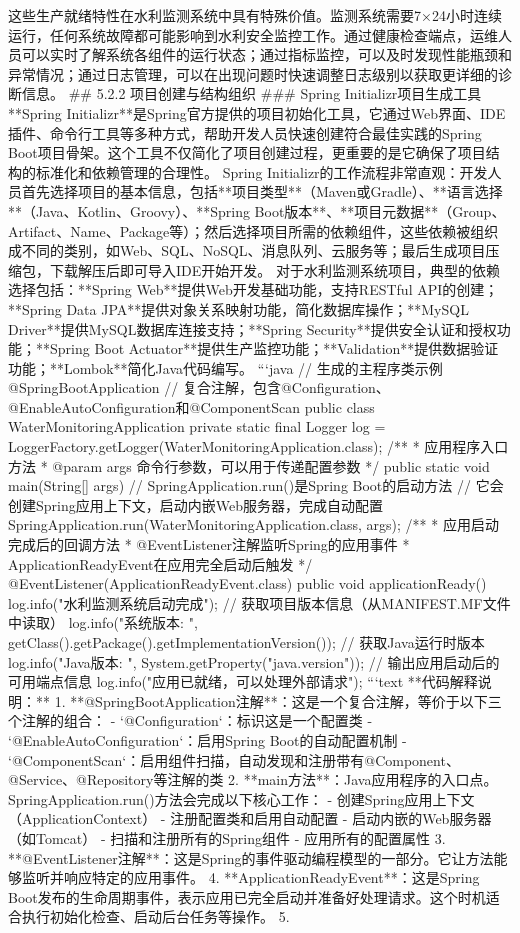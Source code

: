 这些生产就绪特性在水利监测系统中具有特殊价值。监测系统需要7×24小时连续运行，任何系统故障都可能影响到水利安全监控工作。通过健康检查端点，运维人员可以实时了解系统各组件的运行状态；通过指标监控，可以及时发现性能瓶颈和异常情况；通过日志管理，可以在出现问题时快速调整日志级别以获取更详细的诊断信息。 ## 5.2.2 项目创建与结构组织 ### Spring Initializr项目生成工具 **Spring Initializr**是Spring官方提供的项目初始化工具，它通过Web界面、IDE插件、命令行工具等多种方式，帮助开发人员快速创建符合最佳实践的Spring Boot项目骨架。这个工具不仅简化了项目创建过程，更重要的是它确保了项目结构的标准化和依赖管理的合理性。 Spring Initializr的工作流程非常直观：开发人员首先选择项目的基本信息，包括**项目类型**（Maven或Gradle）、**语言选择**（Java、Kotlin、Groovy）、**Spring Boot版本**、**项目元数据**（Group、Artifact、Name、Package等）；然后选择项目所需的依赖组件，这些依赖被组织成不同的类别，如Web、SQL、NoSQL、消息队列、云服务等；最后生成项目压缩包，下载解压后即可导入IDE开始开发。 对于水利监测系统项目，典型的依赖选择包括：**Spring Web**提供Web开发基础功能，支持RESTful API的创建；**Spring Data JPA**提供对象关系映射功能，简化数据库操作；**MySQL Driver**提供MySQL数据库连接支持；**Spring Security**提供安全认证和授权功能；**Spring Boot Actuator**提供生产监控功能；**Validation**提供数据验证功能；**Lombok**简化Java代码编写。 ```java // 生成的主程序类示例 @SpringBootApplication // 复合注解，包含@Configuration、@EnableAutoConfiguration和@ComponentScan public class WaterMonitoringApplication { private static final Logger log = LoggerFactory.getLogger(WaterMonitoringApplication.class); /** * 应用程序入口方法 * @param args 命令行参数，可以用于传递配置参数 */ public static void main(String[] args) { // SpringApplication.run()是Spring Boot的启动方法 // 它会创建Spring应用上下文，启动内嵌Web服务器，完成自动配置 SpringApplication.run(WaterMonitoringApplication.class, args); } /** * 应用启动完成后的回调方法 * @EventListener注解监听Spring的应用事件 * ApplicationReadyEvent在应用完全启动后触发 */ @EventListener(ApplicationReadyEvent.class) public void applicationReady() { log.info("水利监测系统启动完成"); // 获取项目版本信息（从MANIFEST.MF文件中读取） log.info("系统版本: {}", getClass().getPackage().getImplementationVersion()); // 获取Java运行时版本 log.info("Java版本: {}", System.getProperty("java.version")); // 输出应用启动后的可用端点信息 log.info("应用已就绪，可以处理外部请求"); } } ```text **代码解释说明：** 1. **@SpringBootApplication注解**：这是一个复合注解，等价于以下三个注解的组合： - `@Configuration`：标识这是一个配置类 - `@EnableAutoConfiguration`：启用Spring Boot的自动配置机制 - `@ComponentScan`：启用组件扫描，自动发现和注册带有@Component、@Service、@Repository等注解的类 2. **main方法**：Java应用程序的入口点。SpringApplication.run()方法会完成以下核心工作： - 创建Spring应用上下文（ApplicationContext） - 注册配置类和启用自动配置 - 启动内嵌的Web服务器（如Tomcat） - 扫描和注册所有的Spring组件 - 应用所有的配置属性 3. **@EventListener注解**：这是Spring的事件驱动编程模型的一部分。它让方法能够监听并响应特定的应用事件。 4. **ApplicationReadyEvent**：这是Spring Boot发布的生命周期事件，表示应用已完全启动并准备好处理请求。这个时机适合执行初始化检查、启动后台任务等操作。 5. 